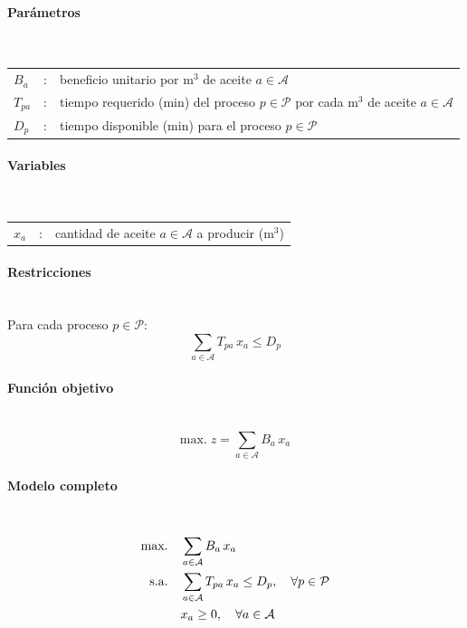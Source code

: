 \paragraph{Parámetros}\mbox{}\\
\begin{tabular}{lcl}
$B_a$ & : & beneficio unitario por m$^3$ de aceite $a \in \mathcal{A}$ \\
$T_{pa}$ & : & tiempo requerido (min) del proceso $p \in \mathcal{P}$ por cada m$^3$ de aceite $a \in \mathcal{A}$ \\
$D_p$ & : & tiempo disponible (min) para el proceso $p \in \mathcal{P}$ \\
\end{tabular}

\paragraph{Variables}\mbox{}\\
\begin{tabular}{lcl}
$x_a$ & : & cantidad de aceite $a \in \mathcal{A}$ a producir (m$^3$) \\
\end{tabular}

\paragraph{Restricciones}\mbox{}\\
Para cada proceso $p \in \mathcal{P}$:
\begin{equation}
\sum_{a \in \mathcal{A}} T_{pa}\,x_a \leq D_p
\end{equation}

\paragraph{Función objetivo}\mbox{}\\
\begin{equation}
\mbox{max.}\; z = \sum_{a \in \mathcal{A}} B_a\,x_a
\end{equation}

\paragraph{Modelo completo}\mbox{}\\
\begin{align}
\mbox{max.}\quad & \sum_{a \in \mathcal{A}} B_a\,x_a \notag \\
\mbox{s.a.}\quad 
& \sum_{a \in \mathcal{A}} T_{pa}\,x_a \leq D_p, \quad \forall p \in \mathcal{P} \notag \\
& x_a \geq 0, \quad \forall a \in \mathcal{A}
\end{align}
